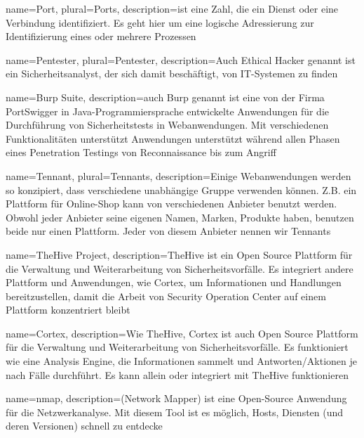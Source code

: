  {
    name={Port},
    plural={Ports},
    description={ist eine Zahl, die ein Dienst oder eine Verbindung identifiziert. Es geht hier um eine logische Adressierung zur Identifizierung eines oder mehrere Prozessen \citep{porttanenbaum}}
}

 {
    name={Pentester},
    plural={Pentester},
    description={Auch Ethical Hacker genannt ist ein Sicherheitsanalyst, der sich damit beschäftigt,   von IT-Systemen zu finden \citep{pentester}}   
}

 {
    name={Burp Suite},
    description={auch Burp genannt ist eine von der Firma PortSwigger in Java-Programmiersprache entwickelte Anwendungen für die Durchführung von Sicherheitstests in Webanwendungen. Mit verschiedenen Funktionalitäten unterstützt Anwendungen unterstützt während allen Phasen eines Penetration Testings von Reconnaissance bis zum Angriff \citep{burp}}   
}

 {
    name={Tennant},
    plural={Tennants},
    description={Einige Webanwendungen werden so konzipiert, dass verschiedene unabhängige Gruppe verwenden können. Z.B. ein Plattform für Online-Shop kann von verschiedenen Anbieter benutzt werden. Obwohl jeder Anbieter seine eigenen Namen, Marken, Produkte haben, benutzen beide nur einen Plattform. Jeder von diesem Anbieter nennen wir Tennants}   
}

 {
    name={TheHive Project},
    description={TheHive ist ein Open Source Plattform für die Verwaltung und Weiterarbeitung von Sicherheitsvorfälle. Es integriert andere Plattform und Anwendungen, wie Cortex, um Informationen und Handlungen bereitzustellen, damit die Arbeit von Security Operation Center auf einem Plattform konzentriert bleibt \citep{TheHive}}   
}

 {
    name={Cortex},
    description={Wie \gls{TheHive}, Cortex ist auch Open Source Plattform für die Verwaltung und Weiterarbeitung von Sicherheitsvorfälle. Es funktioniert wie eine Analysis Engine, die Informationen sammelt und Antworten/Aktionen je nach Fälle durchführt. Es kann allein oder integriert mit TheHive funktionieren \citep{TheHive}}   
}

 {
    name={nmap},
    description={(Network Mapper) ist eine Open-Source Anwendung für die Netzwerkanalyse. Mit diesem Tool ist es möglich, Hosts, Diensten (und deren Versionen) schnell
    zu entdecke\citep{nmap}}    
}


